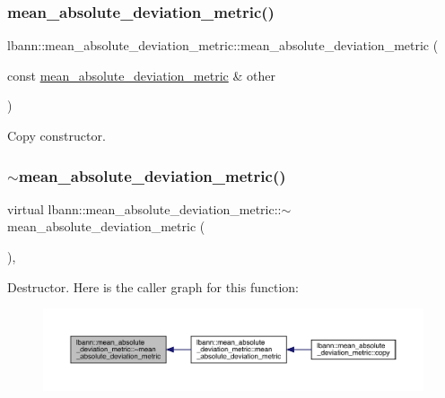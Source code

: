 \subsubsection{\texorpdfstring{mean\+\_\+absolute\+\_\+deviation\+\_\+metric()}{mean\_absolute\_deviation\_metric()}\hspace{0.1cm}{\footnotesize\ttfamily [2/2]}}
{\footnotesize\ttfamily lbann\+::mean\+\_\+absolute\+\_\+deviation\+\_\+metric\+::mean\+\_\+absolute\+\_\+deviation\+\_\+metric (\begin{DoxyParamCaption}\item[{const \hyperlink{classlbann_1_1mean__absolute__deviation__metric}{mean\+\_\+absolute\+\_\+deviation\+\_\+metric} \&}]{other }\end{DoxyParamCaption})\hspace{0.3cm}{\ttfamily [default]}}

Copy constructor. \mbox{\label{classlbann_1_1mean__absolute__deviation__metric_a78ec4ab5b31f87ffd2ceb9589a3a0089}} 
\subsubsection{\texorpdfstring{$\sim$mean\+\_\+absolute\+\_\+deviation\+\_\+metric()}{~mean\_absolute\_deviation\_metric()}}
{\footnotesize\ttfamily virtual lbann\+::mean\+\_\+absolute\+\_\+deviation\+\_\+metric\+::$\sim$mean\+\_\+absolute\+\_\+deviation\+\_\+metric (\begin{DoxyParamCaption}{ }\end{DoxyParamCaption})\hspace{0.3cm}{\ttfamily [virtual]}, {\ttfamily [default]}}

Destructor. Here is the caller graph for this function\+:\nopagebreak
\begin{figure}[H]
\begin{center}
\leavevmode
\includegraphics[width=350pt]{classlbann_1_1mean__absolute__deviation__metric_a78ec4ab5b31f87ffd2ceb9589a3a0089_icgraph}
\end{center}
\end{figure}


